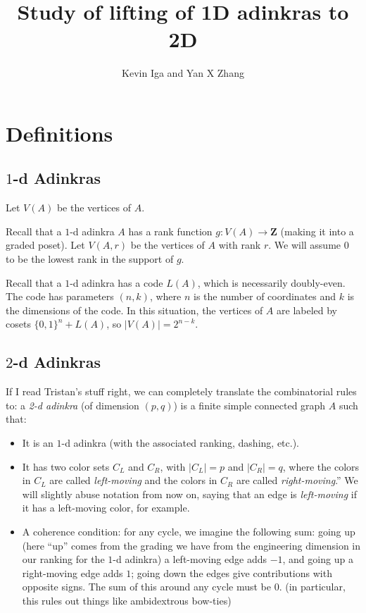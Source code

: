 \documentclass[12pt,twoside,singlespace]{article}
\title{Study of lifting of 1D adinkras to 2D}
\author{Kevin Iga and Yan X Zhang}
\numberwithin{equation}{section}
\theoremstyle{definition}
\newcommand{\ZZ}{\mathbf{Z}}
\begin{document}
\pagestyle{plain}

\maketitle

\section{Definitions}

\subsection{$1$-d Adinkras}

Let $V(A)$ be the vertices of $A$.

Recall that a $1$-d adinkra $A$ has a rank function $g: V(A) \rightarrow \ZZ$ (making it into a graded poset). Let $V(A, r)$ be the vertices of $A$ with rank $r$. We will assume $0$ to be the lowest rank in the support of $g$.

Recall that a $1$-d adinkra has a code $L(A)$, which is necessarily doubly-even. The code has parameters $(n,k)$, where $n$ is the number of coordinates and $k$ is the dimensions of the code. In this situation, the vertices of $A$ are labeled by cosets $\{0,1\}^n + L(A)$, so $|V(A)| = 2^{n-k}$.

\subsection{$2$-d Adinkras}

If I read Tristan's stuff right, we can completely translate the combinatorial rules to: a \emph{2-d adinkra} (of dimension $(p,q)$) is a finite simple connected graph $A$ such that:
\begin{itemize}
\item It is an $1$-d adinkra (with the associated ranking, dashing, etc.).
\item It has two color sets $C_L$ and $C_R$, with $|C_L| = p$ and $|C_R| = q$, where the colors in $C_L$ are called \emph{left-moving} and the colors in $C_R$ are called \emph{right-moving}.'' We will slightly abuse notation from now on, saying that an edge is \emph{left-moving} if it has a left-moving color, for example.
\item A coherence condition: for any cycle, we imagine the following sum: going up (here ``up'' comes from the grading we have from the engineering dimension in our ranking for the $1$-d adinkra) a left-moving edge adds $-1$, and going up a right-moving edge adds $1$; going down the edges give contributions with opposite signs. The sum of this around any cycle must be $0$. (in particular, this rules out things like ambidextrous bow-ties)
\end{itemize} 
\end{document}
